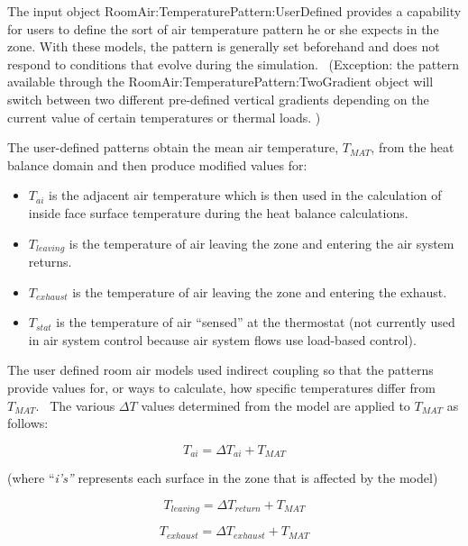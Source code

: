 The input object RoomAir:TemperaturePattern:UserDefined provides a capability for users to define the sort of air temperature pattern he or she expects in the zone. With these models, the pattern is generally set beforehand and does not respond to conditions that evolve during the simulation.~ (Exception: the pattern available through the RoomAir:TemperaturePattern:TwoGradient object will switch between two different pre-defined vertical gradients depending on the current value of certain temperatures or thermal loads. )

The user-defined patterns obtain the mean air temperature, \({T_{MAT}}\), from the heat balance domain and then produce modified values for:

\begin{itemize}
\item \({T_{ai}}\) is the adjacent air temperature which is then used in the calculation of inside face surface temperature during the heat balance calculations.
\item \({T_{leaving}}\) is the temperature of air leaving the zone and entering the air system returns.
\item \({T_{exhaust}}\) is the temperature of air leaving the zone and entering the exhaust.
\item \({T_{stat}}\) is the temperature of air ``sensed'' at the thermostat (not currently used in air system control because air system flows use load-based control).
\end{itemize}

The user defined room air models used indirect coupling so that the patterns provide values for, or ways to calculate, how specific temperatures differ from \({T_{MAT}}\).~ The various \(\Delta T\) values determined from the model are applied to \({T_{MAT}}\) as follows:

\begin{equation}
{T_{ai}} = \Delta {T_{ai}} + {T_{MAT}}
\end{equation}

(where ``\emph{i's''} represents each surface in the zone that is affected by the model)

\begin{equation}
{T_{leaving}} = \Delta {T_{return}} + {T_{MAT}}
\end{equation}

\begin{equation}
{T_{exhaust}} = \Delta {T_{exhaust}} + {T_{MAT}}
\end{equation}

